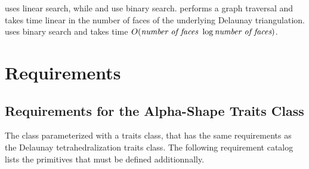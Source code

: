  uses linear search, while 
 and  
use binary search.
 performs a graph traversal and takes time linear in the number of faces of the underlying Delaunay triangulation.
 uses binary search and takes time
$O(\mbox{\em number of faces } \log{\mbox{\em number of faces}})$.

\section{Requirements\label{I1_SectRequirements}}

\subsection{Requirements for the Alpha-Shape Traits Class} 

The class  parameterized with a
traits class, that has the same requirements as the Delaunay
tetrahedralization traits class.  The following requirement catalog lists
the primitives that must be defined additionnally.

